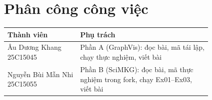 \section*{Phân công công việc}
\begin{table}[h]
\centering
\footnotesize
\setlength{\tabcolsep}{3pt}
\begin{tabular}{@{}ll@{}}
\toprule
Thành viên & Phụ trách \\
\midrule
\makecell[l]{Âu Dương Khang\\ 25C15045} & \makecell[l]{Phần A (GraphVis): đọc bài, mã tái lập,\\ chạy thực nghiệm, viết bài} \\
\midrule
\makecell[l]{Nguyễn Bùi Mẫn Nhi\\ 25C15055} & \makecell[l]{Phần B (SciMKG): đọc bài, mã thực\\ nghiệm trong fork, chạy Ex01--Ex03,\\ viết bài} \\
\bottomrule
\end{tabular}
\end{table}
